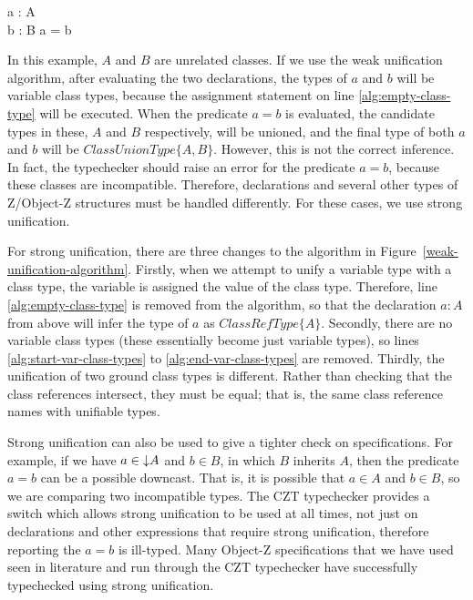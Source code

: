 \begin{axdef}
 a : A\\
 b : B
\where
 a = b
\end{axdef}

In this example, $A$ and $B$ are unrelated classes. If we use the weak
 unification algorithm, after evaluating the two declarations, the
 types of $a$ and $b$ will be variable class types, because the
 assignment statement on line \ref{alg:empty-class-type} will be
 executed. When the predicate $a=b$ is evaluated, the candidate types
 in these, $A$ and $B$ respectively, will be unioned, and the final
 type of both $a$ and $b$ will be $ClassUnionType \{A, B\}$. However,
 this is not the correct inference. In fact, the typechecker should
 raise an error for the predicate $a=b$, because these classes are
 incompatible. Therefore, declarations and several other types of
 Z/Object-Z structures must be handled differently. For these cases,
 we use strong unification.

 For strong unification, there are three changes to the algorithm in
 Figure~\ref{weak-unification-algorithm}. Firstly, when we attempt to
 unify a variable type with a class type, the variable is assigned the
 value of the class type. Therefore, line \ref{alg:empty-class-type}
 is removed from the algorithm, so that the declaration $a:A$ from
 above will infer the type of $a$ as $ClassRefType\{A\}$.  Secondly,
 there are no variable class types (these essentially become just
 variable types), so lines \ref{alg:start-var-class-types} to
 \ref{alg:end-var-class-types} are removed. Thirdly, the unification
 of two ground class types is different. Rather than checking that the
 class references intersect, they must be equal; that is, the same
 class reference names with unifiable types.

 Strong unification can also be used to give a tighter check on
 specifications. For example, if we have $a \in \mathord\downarrow A$ and $b \in
 B$, in which $B$ inherits $A$, then the predicate $a=b$ can be a
 possible downcast. That is, it is possible that $a \in A$ and $b \in
 B$, so we are comparing two incompatible types. The CZT typechecker
 provides a switch which allows strong unification to be used at all
 times, not just on declarations and other expressions that require
 strong unification, therefore reporting the $a=b$ is ill-typed. Many
 Object-Z specifications that we have used seen in literature and run
 through the CZT typechecker have successfully typechecked using
 strong unification.

